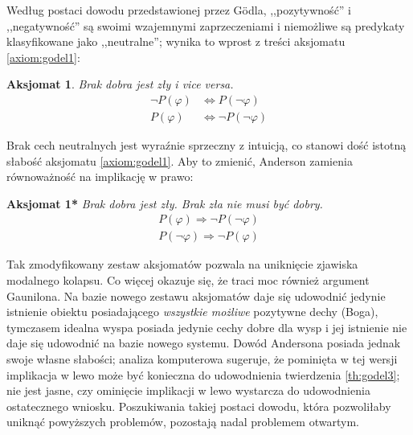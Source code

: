 \documentclass[runningheads]{llncs}
\newtheorem{axiom-pl}{Aksjomat}
\begin{document}
Według postaci dowodu przedstawionej przez G\"odla, ,,pozytywność'' i ,,negatywność'' są swoimi wzajemnymi zaprzeczeniami i niemożliwe są predykaty klasyfikowane jako ,,neutralne''; wynika to wprost z treści aksjomatu \ref{axiom:godel1}:
\begin{axiom-pl}
	Brak dobra jest zły i vice versa. 
	\begin{align*}
	\neg P(\varphi) & \Leftrightarrow P(\neg \varphi) \\ 
	P(\varphi) & \Leftrightarrow \neg P( \neg \varphi )
	\end{align*}
\end{axiom-pl}
Brak cech neutralnych jest wyraźnie sprzeczny z intuicją, co stanowi dość istotną słabość aksjomatu \ref{axiom:godel1}. Aby to zmienić, Anderson zamienia równoważność na implikację w prawo:

\vspace*{0.2cm}
\noindent\textbf{Aksjomat 1*} \hspace*{0.1cm}
\textit{Brak dobra jest zły. Brak zła nie musi być dobry. }
\begin{align*}
	P(\varphi) \Rightarrow \neg P( \neg \varphi ) \\ 
	P( \neg \varphi ) \Rightarrow \neg P(\varphi)
\end{align*}

Tak zmodyfikowany zestaw aksjomatów pozwala na uniknięcie zjawiska modalnego kolapsu. Co więcej okazuje się, że traci moc również argument Gaunilona. Na bazie nowego zestawu aksjomatów daje się udowodnić jedynie istnienie obiektu posiadającego \emph{wszystkie możliwe} pozytywne dechy (Boga), tymczasem idealna wyspa posiada jedynie cechy dobre dla wysp i jej istnienie nie daje się udowodnić na bazie nowego systemu. Dowód Andersona posiada jednak swoje własne słabości; analiza komputerowa sugeruje, że pominięta w tej wersji implikacja w lewo może być konieczna do udowodnienia twierdzenia \ref{th:godel3}; nie jest jasne, czy ominięcie implikacji w lewo wystarcza do udowodnienia ostatecznego wniosku. Poszukiwania takiej postaci dowodu, która pozwoliłaby uniknąć powyższych problemów, pozostają nadal problemem otwartym. 
\end{document}
